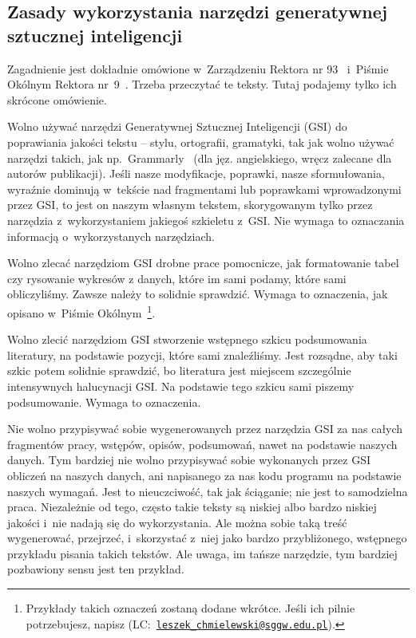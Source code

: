 \subsection{Zasady wykorzystania narzędzi generatywnej sztucznej inteligencji}
\label{sec:dod:ogolne-SI}

Zagadnienie jest dokładnie omówione w~Zarządzeniu Rektora nr 93~ i~Piśmie Okólnym Rektora nr~9~. Trzeba przeczytać te teksty. Tutaj podajemy tylko ich skrócone omówienie.

Wolno używać narzędzi Generatywnej Sztucznej Inteligencji (GSI) do poprawiania jakości tekstu -- stylu, ortografii, gramatyki, tak jak wolno używać narzędzi takich, jak np.\ Grammarly~ (dla jęz. angielskiego, wręcz zalecane dla autorów publikacji). Jeśli nasze modyfikacje, poprawki, nasze sformułowania, wyraźnie dominują w~tekście nad fragmentami lub poprawkami wprowadzonymi przez GSI, to jest on naszym własnym tekstem, skorygowanym tylko przez narzędzia z~wykorzystaniem jakiegoś szkieletu z~GSI. Nie wymaga to oznaczania informacją o~wykorzystanych narzędziach.

Wolno zlecać narzędziom GSI drobne prace pomocnicze, jak formatowanie tabel czy rysowanie wykresów z danych, które im sami podamy, które sami obliczyliśmy. Zawsze należy to solidnie sprawdzić. Wymaga to oznaczenia, jak opisano w~Piśmie Okólnym~\footnote{Przykłady takich oznaczeń zostaną dodane wkrótce. Jeśli ich pilnie potrzebujesz, napisz (LC:~\href{mailto:leszek_chmielewski@sggw.edu.pl}{\tt leszek\_chmielewski@sggw.edu.pl}).}.

Wolno zlecić narzędziom GSI stworzenie wstępnego szkicu podsumowania literatury, na podstawie pozycji, które sami znaleźliśmy. Jest rozsądne, aby taki szkic potem solidnie sprawdzić, bo literatura jest miejscem szczególnie intensywnych halucynacji GSI. Na podstawie tego szkicu sami piszemy podsumowanie. Wymaga to oznaczenia.

Nie wolno przypisywać sobie wygenerowanych przez narzędzia GSI za nas całych fragmentów pracy, wstępów, opisów, podsumowań, nawet na podstawie naszych danych. Tym bardziej nie wolno przypisywać sobie wykonanych przez GSI obliczeń na naszych danych, ani napisanego za nas kodu programu na podstawie naszych wymagań. Jest to nieuczciwość, tak jak ściąganie; nie jest to samodzielna praca. Niezależnie od tego, często takie teksty są niskiej albo bardzo niskiej jakości i~nie nadają się do wykorzystania. Ale można sobie taką treść wygenerować, przejrzeć, i~skorzystać z~niej jako bardzo przybliżonego, wstępnego przykładu pisania takich tekstów. Ale uwaga, im tańsze narzędzie, tym bardziej pozbawiony sensu jest ten przykład.

